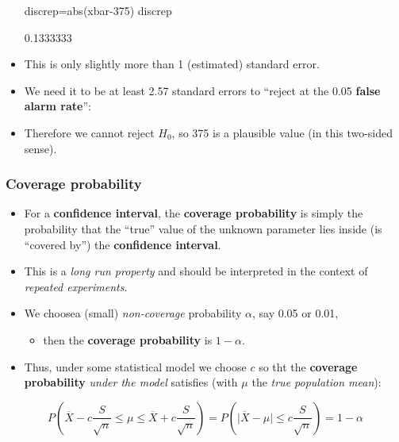 \documentclass[a4paper]{article}\usepackage[]{graphicx}\usepackage[]{xcolor}
\begin{document}
\begin{itemize}
\begin{Schunk}
\begin{Sinput}
discrep=abs(xbar-375)
discrep 
\end{Sinput}
\begin{Soutput}
[1] 0.1333333
\end{Soutput}
\end{Schunk}
	\item This is only slightly more than 1 (estimated) standard error.
	\item We need it to be at least 2.57 standard errors to ``reject at the 0.05 \textcolor{mygreen}{\textbf{false alarm rate}}'':
	\item Therefore we cannot reject \( H_0 \), so 375 is a plausible value (in this two-sided sense).
\end{itemize}
\subsubsection{Coverage probability}
\begin{itemize}
	\item For a \textcolor{myred}{\textbf{confidence interval}}, the \textcolor{myred}{\textbf{coverage probability}} is simply the probability that the ``true'' value of the unknown parameter lies inside (is ``covered by'') the \textcolor{mygreen}{\textbf{confidence interval}}.
	\item This is a \textit{long run property} and should be interpreted in the context of \textit{repeated experiments}.
	\item We choosea (small) \textit{non-coverage} probability \( \alpha \), say 0.05 or 0.01,
	\begin{itemize}
		\item then the \textcolor{myred}{\textbf{coverage probability}} is \( 1-\alpha \). 
	\end{itemize}
	\item Thus, under some statistical model we choose \( c \) so tht the  \textcolor{myred}{\textbf{coverage probability}} \textit{under the model} satisfies (with \( \mu \) the \textit{true population mean}):
\end{itemize}
\[
	P \left( \overline{X} - c \frac{S}{\sqrt{n}} \leq \mu \leq \overline{X} + c \frac{S}{\sqrt{n}} \right) = P \left( \lvert \overline{X} - \mu \rvert \leq c \frac{S}{\sqrt{n}} \right) = 1 - \alpha
\]
\end{document}
